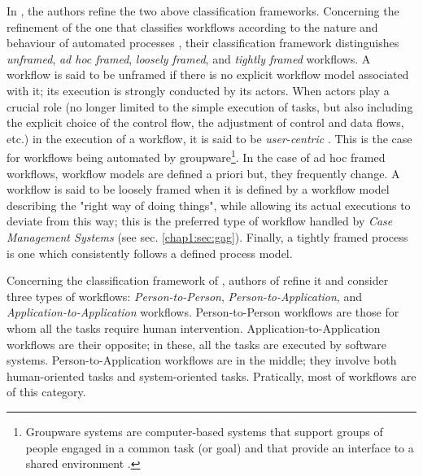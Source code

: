 In \cite{dumas2005process}, the authors refine the two above classification frameworks. Concerning the refinement of the one that classifies workflows according to the nature and behaviour of automated processes \cite{mcCready}, their classification framework distinguishes \textit{unframed}, \textit{ad hoc framed}, \textit{loosely framed}, and \textit{tightly framed} workflows. 
A workflow is said to be unframed if there is no explicit workflow model associated with it; its execution is strongly conducted by its actors. When actors play a crucial role (no longer limited to the simple execution of tasks, but also including the explicit choice of the control flow, the adjustment of control and data flows, etc.) in the execution of a workflow, it is said to be \textit{user-centric} \cite{badouel2015active}. This is the case for workflows being automated by groupware\footnote{Groupware systems are computer-based systems that support groups of people engaged in a common task (or goal) and that provide an interface to a shared environment \cite{ellis1991groupware}.}. 
In the case of ad hoc framed workflows, workflow models are defined a priori but, they frequently change. 
A workflow is said to be loosely framed when it is defined by a workflow model describing the "right way of doing things", while allowing its actual executions to deviate from this way; this is the preferred type of workflow handled by \textit{Case Management Systems} \cite{van2013business} (see sec. \ref{chap1:sec:gag}).
Finally, a tightly framed process is one which consistently follows a defined process model.

Concerning the classification framework of \cite{workflow95}, authors of \cite{dumas2005process} refine it and consider three types of workflows: \textit{Person-to-Person}, \textit{Person-to-Application}, and \textit{Application-to-Application} workflows. 
Person-to-Person workflows are those for whom all the tasks require human intervention. Application-to-Application workflows are their opposite; in these, all the tasks are executed by software systems. Person-to-Application workflows are in the middle; they involve both human-oriented tasks and system-oriented tasks. Pratically, most of workflows are of this category.

